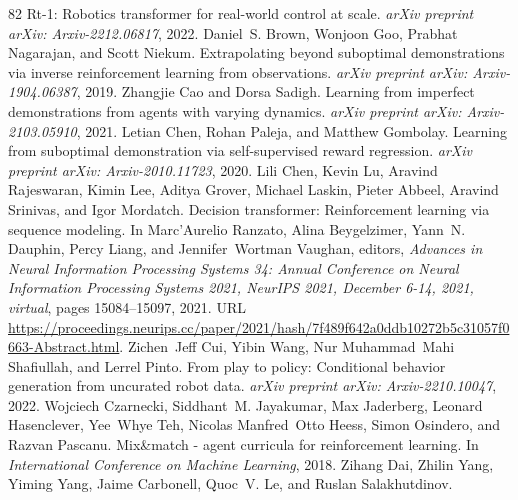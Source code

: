 \documentclass{article}
\begin{document}
\begin{thebibliography}{82}
\newblock Rt-1: Robotics transformer for real-world control at scale.
\newblock \emph{arXiv preprint arXiv: Arxiv-2212.06817}, 2022.
Daniel~S. Brown, Wonjoon Goo, Prabhat Nagarajan, and Scott Niekum.
\newblock Extrapolating beyond suboptimal demonstrations via inverse reinforcement learning from observations.
\newblock \emph{arXiv preprint arXiv: Arxiv-1904.06387}, 2019.
Zhangjie Cao and Dorsa Sadigh.
\newblock Learning from imperfect demonstrations from agents with varying dynamics.
\newblock \emph{arXiv preprint arXiv: Arxiv-2103.05910}, 2021.
Letian Chen, Rohan Paleja, and Matthew Gombolay.
\newblock Learning from suboptimal demonstration via self-supervised reward regression.
\newblock \emph{arXiv preprint arXiv: Arxiv-2010.11723}, 2020.
Lili Chen, Kevin Lu, Aravind Rajeswaran, Kimin Lee, Aditya Grover, Michael Laskin, Pieter Abbeel, Aravind Srinivas, and Igor Mordatch.
\newblock Decision transformer: Reinforcement learning via sequence modeling.
\newblock In Marc'Aurelio Ranzato, Alina Beygelzimer, Yann~N. Dauphin, Percy Liang, and Jennifer~Wortman Vaughan, editors, \emph{Advances in Neural Information Processing Systems 34: Annual Conference on Neural Information Processing Systems 2021, NeurIPS 2021, December 6-14, 2021, virtual}, pages 15084--15097, 2021.
\newblock URL \url{https://proceedings.neurips.cc/paper/2021/hash/7f489f642a0ddb10272b5c31057f0663-Abstract.html}.
Zichen~Jeff Cui, Yibin Wang, Nur Muhammad~Mahi Shafiullah, and Lerrel Pinto.
\newblock From play to policy: Conditional behavior generation from uncurated robot data.
\newblock \emph{arXiv preprint arXiv: Arxiv-2210.10047}, 2022.
Wojciech Czarnecki, Siddhant~M. Jayakumar, Max Jaderberg, Leonard Hasenclever, Yee~Whye Teh, Nicolas Manfred~Otto Heess, Simon Osindero, and Razvan Pascanu.
\newblock Mix\&match - agent curricula for reinforcement learning.
\newblock In \emph{International Conference on Machine Learning}, 2018.
Zihang Dai, Zhilin Yang, Yiming Yang, Jaime Carbonell, Quoc~V. Le, and Ruslan Salakhutdinov.

\end{thebibliography}
\end{document}
